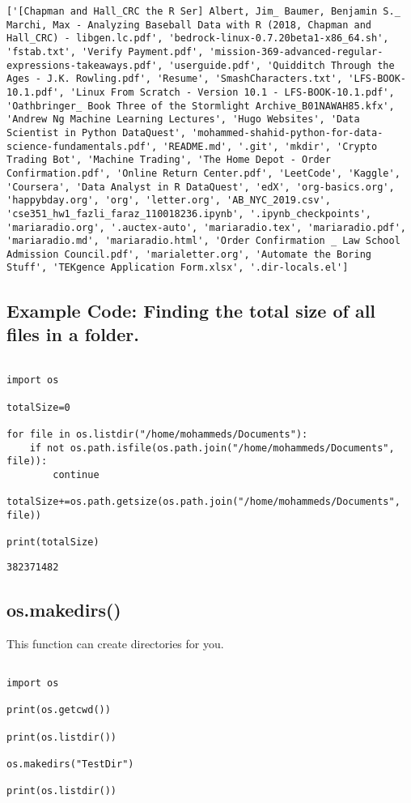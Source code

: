 \documentclass[11pt]{article}
\begin{document}
\begin{verbatim}
['[Chapman and Hall_CRC the R Ser] Albert, Jim_ Baumer, Benjamin S._ Marchi, Max - Analyzing Baseball Data with R (2018, Chapman and Hall_CRC) - libgen.lc.pdf', 'bedrock-linux-0.7.20beta1-x86_64.sh', 'fstab.txt', 'Verify Payment.pdf', 'mission-369-advanced-regular-expressions-takeaways.pdf', 'userguide.pdf', 'Quidditch Through the Ages - J.K. Rowling.pdf', 'Resume', 'SmashCharacters.txt', 'LFS-BOOK-10.1.pdf', 'Linux From Scratch - Version 10.1 - LFS-BOOK-10.1.pdf', 'Oathbringer_ Book Three of the Stormlight Archive_B01NAWAH85.kfx', 'Andrew Ng Machine Learning Lectures', 'Hugo Websites', 'Data Scientist in Python DataQuest', 'mohammed-shahid-python-for-data-science-fundamentals.pdf', 'README.md', '.git', 'mkdir', 'Crypto Trading Bot', 'Machine Trading', 'The Home Depot - Order Confirmation.pdf', 'Online Return Center.pdf', 'LeetCode', 'Kaggle', 'Coursera', 'Data Analyst in R DataQuest', 'edX', 'org-basics.org', 'happybday.org', 'org', 'letter.org', 'AB_NYC_2019.csv', 'cse351_hw1_fazli_faraz_110018236.ipynb', '.ipynb_checkpoints', 'mariaradio.org', '.auctex-auto', 'mariaradio.tex', 'mariaradio.pdf', 'mariaradio.md', 'mariaradio.html', 'Order Confirmation _ Law School Admission Council.pdf', 'marialetter.org', 'Automate the Boring Stuff', 'TEKgence Application Form.xlsx', '.dir-locals.el']
\end{verbatim}

\subsection{Example Code: Finding the total size of all files in a folder.}
\label{sec:orgb3a2218}

\begin{verbatim}

import os

totalSize=0

for file in os.listdir("/home/mohammeds/Documents"):
    if not os.path.isfile(os.path.join("/home/mohammeds/Documents", file)):
        continue
    totalSize+=os.path.getsize(os.path.join("/home/mohammeds/Documents", file))

print(totalSize)

\end{verbatim}

\begin{verbatim}
382371482
\end{verbatim}

\subsection{os.makedirs()}
\label{sec:org4334088}

This function can create directories for you.

\begin{verbatim}

import os

print(os.getcwd())

print(os.listdir())

os.makedirs("TestDir")

print(os.listdir())

\end{verbatim}
\end{document}
